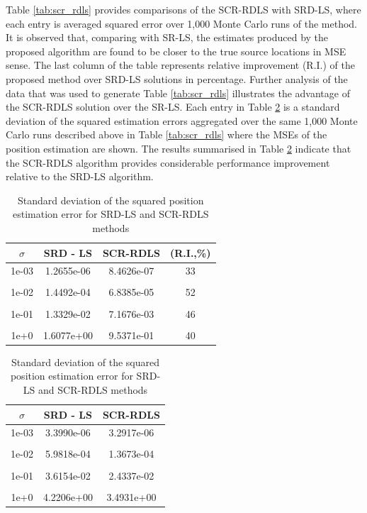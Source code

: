 Table \ref{tab:scr_rdls}  provides comparisons of the SCR-RDLS with SRD-LS, where each entry is averaged squared error over 1,000 Monte Carlo runs of the method. %
 It is observed that, comparing with SR-LS, the estimates produced by the proposed algorithm are found to be closer to the true source locations in MSE sense. The last column of the table  represents relative improvement (R.I.) of the proposed method over SRD-LS solutions in percentage. Further analysis of the data that was used to generate Table \ref{tab:scr_rdls} illustrates the advantage of the SCR-RDLS solution over the SR-LS. 
Each entry in Table \ref{tab:rdls} is a standard deviation of the squared  estimation errors  aggregated over the  same 1,000 Monte Carlo runs described above in Table \ref{tab:scr_rdls} where the MSEs of the position estimation are shown. The results summarised in Table \ref{tab:rdls} indicate that the SCR-RDLS algorithm provides considerable performance improvement relative to the SRD-LS algorithm.

\begin{table}[h]
\centering
\caption{MSE of position estimation for SRD-LS and SCR-RDLS methods}
\phantom{m}
\begin{tabular}{|c|c|c|c|} \hline
\centering
$\sigma$ & SRD - LS & SCR-RDLS & (R.I.,\%)  \\ \hline
1e-03&	1.2655e-06  & 8.4626e-07 &  33 \\ &&&\\
1e-02&	1.4492e-04 &  6.8385e-05 &  52 \\ &&&\\
1e-01&	1.3329e-02 & 7.1676e-03 &   46 \\ &&&\\
1e+0&	1.6077e+00 &  9.5371e-01 &   40  \\ %
\hline
\end{tabular}
\label{tab:scr_rdls}
\centering
\caption{Standard deviation of the squared position estimation error for SRD-LS and SCR-RDLS methods}
\phantom{m}
\begin{tabular}{|c|c|c|} \hline
$\sigma$ & SRD - LS & SCR-RDLS  \\ \hline
1e-03&	3.3990e-06 &  3.2917e-06 \\ &&\\
1e-02&	5.9818e-04 &   1.3673e-04 \\ &&\\
1e-01&	3.6154e-02  & 2.4337e-02 \\ &&\\
1e+0&	4.2206e+00 &  3.4931e+00 \\ %
\hline
\end{tabular}
\label{tab:rdls}
\end{table}

\phantom{m}

